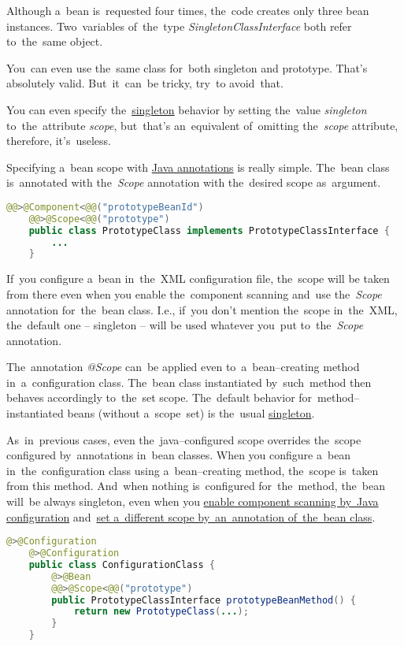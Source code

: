 \noindent Although a~bean is~requested four times, the~code creates only three bean instances.
Two~variables of~the~type \textit{SingletonClassInterface} both refer to~the~same object.

\note You~can even use the~same class for~both singleton and prototype.
That's absolutely valid.
But~it~can~be tricky, try~to avoid~that.

\note You can even specify the~\hyperref[singletondp]{singleton} behavior by setting the~value \textit{singleton} to~the~attribute \textit{scope}, but~that's an~equivalent of~omitting the~\textit{scope} attribute, therefore, it's~useless.

\label{bsannotations}
Specifying a~bean scope with \hyperref[javaannotation]{Java annotations} is really simple.
The~bean class is~annotated with the~\textit{Scope} annotation with the~desired scope as~argument.

\example
\begin{lstlisting}[language=Java, title={Bean class with the prototype scope set by the annotation}]@@>@Component<@@("prototypeBeanId")
    @@>@Scope<@@("prototype")
    public class PrototypeClass implements PrototypeClassInterface {
        ...
    }
\end{lstlisting}

\warning If~you configure a~bean in~the~XML configuration file, the~scope will be taken from there even when you enable the~component scanning and~use the~\textit{Scope} annotation for~the~bean class.
I.e., if~you don't mention the~scope in~the~XML, the~default one -- singleton -- will be used whatever you~put to~the~\textit{Scope} annotation.

The~annotation \textit{@Scope} can~be applied even to~a~bean--creating method in~a~configuration class.
The~bean class instantiated by~such~method then behaves accordingly to~the~set scope.
The~default behavior for~method--instantiated beans (without a~scope~set) is the~usual \hyperref[singletondp]{singleton}.

\warning As~in~previous cases, even the~java--configured scope overrides the~scope configured by~annotations in~bean classes.
When you configure a~bean in~the~configuration class using a~bean--creating method, the~scope is~taken from this method.
And~when nothing is~configured for~the~method, the~bean will~be always singleton, even when you \hyperref[iocnoxml]{enable component scanning by~Java configuration} and~\hyperref[bsannotations]{set a~different scope by~an~annotation of~the~bean class}.

\example
\enlargethispage{10mm}
\thispagestyle{empty}
\begin{lstlisting}[language=Java, title={Configuration class with a prototype bean--creating metod}]@>@Configuration
    @>@Configuration
    public class ConfigurationClass {
        @>@Bean
        @@>@Scope<@@("prototype")
        public PrototypeClassInterface prototypeBeanMethod() {
            return new PrototypeClass(...);
        }
    }
\end{lstlisting}
\newpage
